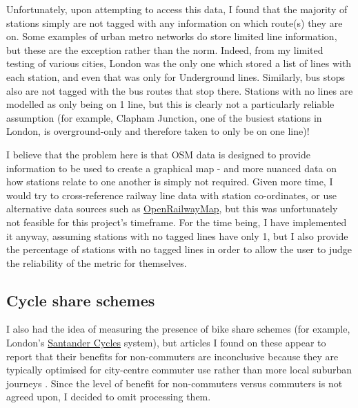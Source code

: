 \documentclass[12pt]{article} %
\begin{document}
Unfortunately, upon attempting to access this data, I found that the majority of stations simply are not tagged with any information on which route(s) they are on. Some examples of urban metro networks do store limited line information, but these are the exception rather than the norm. Indeed, from my limited testing of various cities, London was the only one which stored a list of lines with each station, and even that was only for Underground lines. Similarly, bus stops also are not tagged with the bus routes that stop there. Stations with no lines are modelled as only being on 1 line, but this is clearly not a particularly reliable assumption (for example, Clapham Junction, one of the busiest stations in London, is overground-only and therefore taken to only be on one line)!

I believe that the problem here is that OSM data is designed to provide information to be used to create a graphical map - and more nuanced data on how stations relate to one another is simply not required. Given more time, I would try to cross-reference railway line data with station co-ordinates, or use alternative data sources such as \href{https://www.openrailwaymap.org/}{OpenRailwayMap}, but this was unfortunately not feasible for this project's timeframe. For the time being, I have implemented it anyway, assuming stations with no tagged lines have only 1, but I also provide the percentage of stations with no tagged lines in order to allow the user to judge the reliability of the metric for themselves.

\subsection{Cycle share schemes}
I also had the idea of measuring the presence of bike share schemes (for example, London's \href{https://tfl.gov.uk/modes/cycling/santander-cycles}{Santander Cycles} system), but articles I found on these appear to report that their benefits for non-commuters are inconclusive because they are typically optimised for city-centre commuter use rather than more local suburban journeys \parencite{Beecham2014}. Since the level of benefit for non-commuters versus commuters is not agreed upon, I decided to omit processing them.
\end{document}
